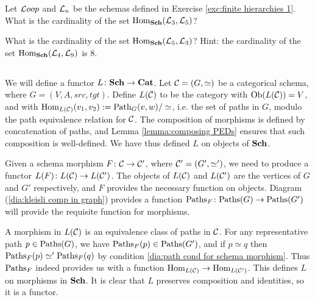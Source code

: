 \documentclass[CT4S-EN-RU]{subfiles}
\begin{document}
\begin{exerciseRUS}\label{exc:finite hierarchies 1}
\end{exerciseRUS}

\begin{exerciseENG}
Let ${\mathcal{L} oop}$ and $\mathcal{L}_n$ be the schemas defined in Exercise \ref{exc:finite hierarchies 1}.
\sexc What is the cardinality of the set $\textnormal{Hom}_{\mathbf{Sch}}(\mathcal{L}_3,\mathcal{L}_5)$?
\item What is the cardinality of the set $\textnormal{Hom}_{\mathbf{Sch}}(\mathcal{L}_5,\mathcal{L}_3)$? Hint: the cardinality of the set $\textnormal{Hom}_{\mathbf{Sch}}(\mathcal{L}_4,\mathcal{L}_9)$ is 8.
\endsexc
\end{exerciseENG}

\begin{exerciseRUS}
\end{exerciseRUS}


\subsection{}\label{sec:proof of cat=sch}

\begin{constructionENG}
We will define a functor $L\colon{\mathbf{Sch}}\rightarrow{\mathbf{Cat}}$. Let $\mathcal{C}=(G,\simeq)$ be a categorical schema, where $G=(V,A,src,tgt)$. Define $L(\mathcal{C})$ to be the category with $\textnormal{Ob}(L(\mathcal{C}))=V$, and with $\textnormal{Hom}_{L(\mathcal{C})}(v_1,v_2):=\textnormal{Path}_G(v,w)/\simeq$, i.e. the set of paths in $G$, modulo the path equivalence relation for $\mathcal{C}$. The composition of morphisms is defined by concatenation of paths, and Lemma \ref{lemma:composing PEDs} ensures that such composition is well-defined. We have thus defined $L$ on objects of ${\mathbf{Sch}}$.

Given a schema morphism $F\colon\mathcal{C}\rightarrow\mathcal{C}'$, where $\mathcal{C}'=(G',\simeq')$, we need to produce a functor $L(F)\colon L(\mathcal{C})\rightarrow L(\mathcal{C}')$. The objects of $L(\mathcal{C})$ and $L(\mathcal{C}')$ are the vertices of $G$ and $G'$ respectively, and $F$ provides the necessary function on objects. Diagram (\ref{dia:kleisli comp in graph}) provides a function $\textnormal{Paths}_F\colon\textnormal{Paths}(G)\rightarrow\textnormal{Paths}(G')$ will provide the requisite function for morphisms. 

A morphism in $L(\mathcal{C})$ is an equivalence class of paths in $\mathcal{C}$. For any representative path $p\in\textnormal{Paths}(G)$, we have $\textnormal{Paths}_F(p)\in\textnormal{Paths}(G')$, and if $p\simeq q$ then $\textnormal{Paths}_F(p)\simeq'\textnormal{Paths}_F(q)$ by condition \ref{dia:path cond for schema morphism}. Thus $\textnormal{Paths}_F$ indeed provides us with a function $\textnormal{Hom}_{L(\mathcal{C})}\rightarrow\textnormal{Hom}_{L(\mathcal{C}')}$. This defines $L$ on morphisms in ${\mathbf{Sch}}$. It is clear that $L$ preserves composition and identities, so it is a functor.
\end{constructionENG}
\end{document}
